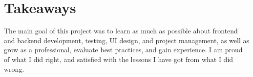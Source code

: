 \section{Takeaways}\label{sec:takeaways}

The main goal of this project
was to learn as much as possible about
frontend and backend development,
testing,
\ac{UI} design, and
project management,
as well as grow as a professional,
evaluate best practices,
and gain experience.
I am proud of what I did right,
and satisfied with the lessons
I have got from what I did wrong.




